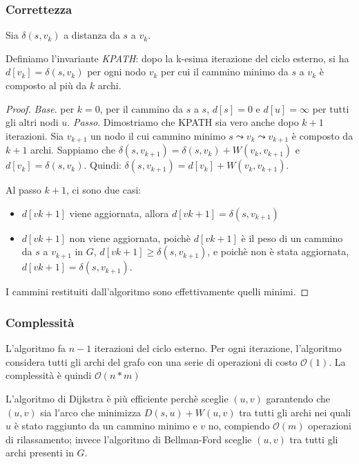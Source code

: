 \documentclass[11pt]{book}
\begin{document}
\subsubsection{Correttezza}
Sia $\delta(s,v_k)$ a distanza da $s$ a $v_k$.

Definiamo l'invariante \textit{KPATH}: dopo la k-esima iterazione del ciclo esterno, si ha $d[v_k]=\delta(s,v_k)$ per ogni 
nodo $v_k$ per cui il cammino minimo da $s$ a $v_k$ è composto al più da $k$ archi.
\begin{proof}
    \textit{Base}. per $k=0$, per il cammino da $s$ a $s$, $d[s]=0$ e $d[u]=\infty$ per tutti gli altri nodi $u$. 
    \textit{Passo}. Dimostriamo che KPATH sia vero anche dopo $k+1$ iterazioni. Sia $v_{k+1}$ un nodo il cui cammino minimo 
    $s\leadsto v_k\leadsto v_{k+1}$ è composto da $k+1$ archi. Sappiamo che $\delta(s,v_{k+1})=\delta(s,v_k)+W(v_k,v_{k+1})$
    e $d[v_k]=\delta(s,v_k)$. Quindi: $\delta(s,v_{k+1})=d[v_k]+W(v_k,v_{k+1})$.

    Al passo $k+1$, ci sono due casi:
    \begin{itemize}
        \item $d[v{k+1}]$ viene aggiornata, allora $d[v{k+1}]=\delta(s,v_{k+1})$
        \item $d[v{k+1}]$ non viene aggiornata, poichè $d[v{k+1}]$ è il peso di un cammino da $s$ a $v_{k+1}$ in $G$, 
        $d[v{k+1}]\geq \delta(s,v_{k+1})$, e poichè non è stata aggiornata, $d[v{k+1}]=\delta(s,v_{k+1})$.
    \end{itemize}
    I cammini restituiti dall'algoritmo sono effettivamente quelli minimi.
\end{proof}
\subsubsection{Complessità}
L'algoritmo fa $n-1$ iterazioni del ciclo esterno. Per ogni iterazione, l'algoritmo considera tutti gli archi del grafo 
con una serie di operazioni di costo $\mathcal{O}(1)$. La complessità è quindi $\mathcal{O}(n*m)$

L'algoritmo di Dijkstra è più efficiente perchè sceglie $(u,v)$ garantendo che $(u,v)$ sia l'arco che minimizza $D(s,u)+W(u,v)$
tra tutti gli archi nei quali $u$ è stato raggiunto da un cammino minimo e $v$ no, compiendo $\mathcal{O}(m)$ operazioni 
di rilassamento; invece l'algoritmo di Bellman-Ford sceglie $(u,v)$ tra tutti gli archi presenti in $G$.
\end{document}
